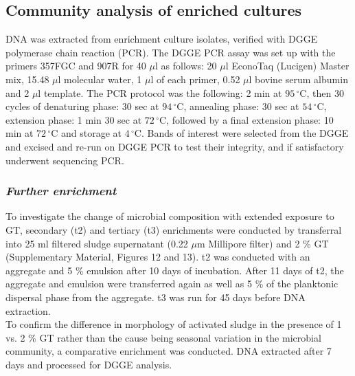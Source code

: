 \documentclass[twoside]{article}
\begin{document}
\subsection{Community analysis of enriched cultures}
DNA was extracted from enrichment culture isolates, verified with DGGE polymerase chain reaction (PCR). The DGGE PCR assay was set up with the primers 357FGC and 907R for 40 $\mu$l as follows: 20 $\mu$l EconoTaq (Lucigen) Master mix, 15.48 $\mu$l molecular water, 1 $\mu$l of each primer, 0.52 $\mu$l bovine serum albumin and 2 $\mu$l template. The PCR protocol was the following: 2 min at $95\,^{\circ}\mathrm{C}$, then 30 cycles of denaturing phase: 30 sec at $94\,^{\circ}\mathrm{C}$, annealing phase: 30 sec at  $54\,^{\circ}\mathrm{C}$, extension phase: 1 min 30 sec at $72\,^{\circ}\mathrm{C}$, followed by a final extension phase: 10 min at $72\,^{\circ}\mathrm{C}$ and storage at $4\,^{\circ}\mathrm{C}$.
Bands of interest were selected from the DGGE and excised and re-run on DGGE PCR to test their integrity, and if satisfactory underwent sequencing PCR. 

\subsubsection{\emph{Further enrichment}}
To investigate the change of microbial composition with extended exposure to GT, secondary (t2) and tertiary (t3) enrichments were conducted by transferral into 25 ml filtered sludge supernatant (0.22 $\mu$m Millipore filter) and 2 \% GT (Supplementary Material, Figures 12 and 13). t2 was conducted with an aggregate and 5 \% emulsion after 10 days of incubation. After 11 days of t2, the aggregate and emulsion were transferred again as well as 5 \% of the planktonic dispersal phase from the aggregate. t3 was run for 45 days before DNA extraction.\\

To confirm the difference in morphology of activated sludge in the presence of 1 vs. 2 \% GT rather than the cause being seasonal variation in the microbial community, a comparative enrichment was conducted. DNA extracted after 7 days and processed for DGGE analysis.
 
\end{document}
